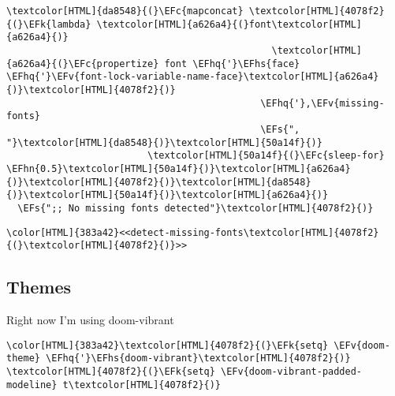 \documentclass{scrartcl}
\newcommand{\EFk}[1]{\textcolor{EFk}{#1}} %
\newcommand{\EFs}[1]{\textcolor{EFs}{#1}} %
\newcommand{\EFc}[1]{\textcolor{EFc}{#1}} %
\newcommand{\EFv}[1]{\textcolor{EFv}{#1}} %
\newcommand{\EFhn}[1]{\textcolor{EFhn}{\textbf{#1}}} %
\newcommand{\EFhq}[1]{\textcolor{EFhq}{#1}} %
\newcommand{\EFhs}[1]{\textcolor{EFhs}{#1}} %
\begin{document}
\begin{Code}
\begin{Verbatim}[]
                                  \textcolor[HTML]{da8548}{(}\EFc{mapconcat} \textcolor[HTML]{4078f2}{(}\EFk{lambda} \textcolor[HTML]{a626a4}{(}font\textcolor[HTML]{a626a4}{)}
                                               \textcolor[HTML]{a626a4}{(}\EFc{propertize} font \EFhq{'}\EFhs{face} \EFhq{'}\EFv{font-lock-variable-name-face}\textcolor[HTML]{a626a4}{)}\textcolor[HTML]{4078f2}{)}
                                             \EFhq{'},\EFv{missing-fonts}
                                             \EFs{", "}\textcolor[HTML]{da8548}{)}\textcolor[HTML]{50a14f}{)}
                         \textcolor[HTML]{50a14f}{(}\EFc{sleep-for} \EFhn{0.5}\textcolor[HTML]{50a14f}{)}\textcolor[HTML]{a626a4}{)}\textcolor[HTML]{4078f2}{)}\textcolor[HTML]{da8548}{)}\textcolor[HTML]{50a14f}{)}\textcolor[HTML]{a626a4}{)}
  \EFs{";; No missing fonts detected"}\textcolor[HTML]{4078f2}{)}
\end{Verbatim}
\end{Code}

\begin{Code}
\begin{Verbatim}[]
\color[HTML]{383a42}<<detect-missing-fonts\textcolor[HTML]{4078f2}{(}\textcolor[HTML]{4078f2}{)}>>
\end{Verbatim}
\end{Code}

\subsection{Themes}
\label{sec:org52f717e}
Right now I'm using doom-vibrant
\begin{Code}
\begin{Verbatim}[]
\color[HTML]{383a42}\textcolor[HTML]{4078f2}{(}\EFk{setq} \EFv{doom-theme} \EFhq{'}\EFhs{doom-vibrant}\textcolor[HTML]{4078f2}{)}
\textcolor[HTML]{4078f2}{(}\EFk{setq} \EFv{doom-vibrant-padded-modeline} t\textcolor[HTML]{4078f2}{)}
\end{Verbatim}
\end{Code}
\end{document}
